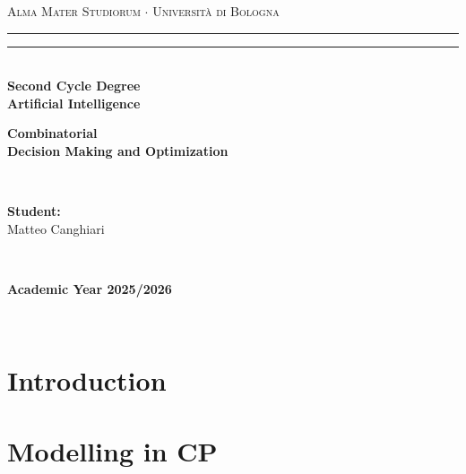 \documentclass[12pt,a4paper,twoside]{book}
\begin{document}
\pagestyle{empty}
\begin{titlepage}
\begin{center}
    {{\Large{\textsc{Alma Mater Studiorum $\cdot$ Università di Bologna}}}}
    \rule[0.1cm]{\textwidth}{0.1mm}
    \rule[0.5cm]{\textwidth}{0.6mm}\\
    {\small{\bf Second Cycle Degree\\
    Artificial Intelligence}}
\end{center}

\vspace{45mm}

\begin{center}
    \textbf{Combinatorial \\ Decision Making and Optimization}
\end{center}

\vspace{60mm}
\par
\noindent
\begin{minipage}[t]{0.04\textwidth}
~
\end{minipage}
\begin{minipage}[t]{0.4\textwidth}
{{\textbf{Student:}\\
Matteo Canghiari}}
\end{minipage}
\begin{minipage}[t]{0.04\textwidth}
~
\end{minipage}

\vspace{30mm}

\begin{center}
    {\large{\bf Academic Year 2025/2026}}
\end{center}
\end{titlepage}

\restoregeometry

\pagestyle{empty}
\newpage~\newpage
\thispagestyle{empty}

\clearpage
{}
\pagestyle{plain}

\chapter{Introduction}

\label{c_1}

\chapter{Modelling in CP}

\label{c_2}
\end{document}
